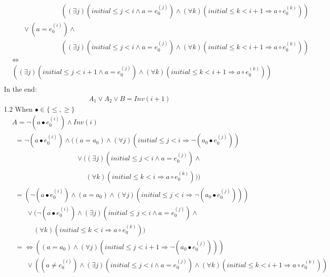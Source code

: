 \documentclass[a4paper,10pt]{article}
\newcommand{\idx}{\ensuremath{i}\xspace}
\newcommand{\idxinitial}{\ensuremath{\mathit{initial}}\xspace}
\newcommand{\at}[1]{{(#1)}}
\newcommand{\impl}{\ensuremath{\Longrightarrow}}
\newcommand{\Inv}[1]{\ensuremath{\mathit{Inv}(#1)\xspace}}
\newenvironment{proof}[1][Proof.]{\begin{trivlist}
\item[\hskip \labelsep {\bfseries #1}]}{\end{trivlist}}
\begin{document}
\begin{proof}
\begin{align*}
   &\phantom {\Leftrightarrow (a \neq e_0^\at{\idx})}
     ((\exists j)(\idxinitial \leq j < \idx \land a = e_0^\at{j}) \land (\forall k)(\idxinitial \leq k < \idx+1 \impl a \circ e_0^\at{k})) \\ 
   &\phantom {\Leftrightarrow} \lor (a = e_0^\at{\idx}) \land\\
   &\phantom {\Leftrightarrow (a \neq e_0^\at{\idx})}
     ((\exists j)(\idxinitial \leq j < \idx \land a = e_0^\at{j}) \land (\forall k)(\idxinitial \leq k < \idx+1 \impl a \circ e_0^\at{k})) \\ 
   &\Leftrightarrow\\
   &((\exists j)(\idxinitial \leq j < \idx+1 \land a = e_0^\at{j}) \land (\forall k)(\idxinitial \leq k < \idx+1 \impl a \circ e_0^\at{k})) \\ 
  \end{align*}
  In the end:
  \begin{align*}
    &A_1 \lor A_2 \lor B = \Inv{\idx+1} 
  \end{align*}
  1.2 When $\bullet \in \{\leq, \geq\}$ 
  \begin{align*}
    &A= \neg (a \bullet e_0^\at{\idx}) \land \Inv{\idx} \\
    &~~= \neg (a \bullet e_0^\at{\idx}) \land ((a = a_0) \land (\forall j)(\idxinitial \leq j < \idx \impl \neg (a_0 \bullet e_0^\at{j})) \\
    &\phantom{A= \neg (a \bullet e_0^\at{\idx}) \land (}
       \lor ((\exists j)(\idxinitial \leq j < \idx \land a = e_0^\at{j}) \land\\
    &\phantom{A= \neg (a \bullet e_0^\at{\idx}) \land  (( \lor (}
       (\forall k)(\idxinitial \leq k < \idx \impl a \circ e_0^\at{k}))) \\
    &~~= (\neg (a \bullet e_0^\at{\idx}) \land (a = a_0) \land (\forall j)(\idxinitial \leq j < \idx \impl \neg (a_0 \bullet e_0^\at{j}))) \\
    &\phantom{A=} 
       \lor (\neg (a \bullet e_0^\at{\idx}) \land (\exists j)(\idxinitial \leq j < \idx \land a = e_0^\at{j}) \land\\ 
    &\phantom{A= \lor (} 
       (\forall k)(\idxinitial \leq k < \idx \impl a \circ e_0^\at{k})) \\    
    &~~=\Leftrightarrow ((a = a_0) \land (\forall j)(\idxinitial \leq j < \idx+1 \impl \neg (a_0 \bullet e_0^\at{j}))) \\
    &\phantom{A=} 
       \lor ((a \neq e_0^\at{\idx}) \land (\exists j)(\idxinitial \leq j < \idx \land a = e_0^\at{j}) \land 
        (\forall k)(\idxinitial \leq k < \idx+1 \impl a \circ e_0^\at{k})) \\           

\end{align*}
\end{proof}
\end{document}

